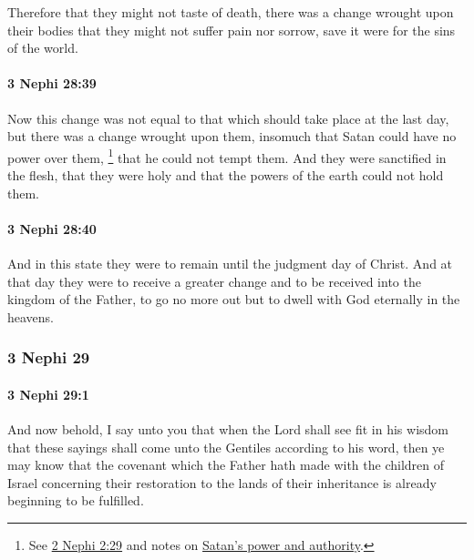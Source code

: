 			Therefore that they might not taste of death,
			there was a change wrought upon their bodies
			that they might not suffer pain nor sorrow,
			save it were for the sins of the world.

		\paragraph{3 Nephi 28:39} %
			\label{3NEPHI-28-39}

			Now this change was not equal
			to that which should take place at the last day,
			but there was a change wrought upon them,
			insomuch that Satan could have no power over them,%
				\footnote{%
					See \hyperref[2NEPHI-2-29]{2 Nephi 2:29} and notes on \hyperref[SATAN-power]{Satan's power and authority}.
					}
			that he could not tempt them.
			And they were sanctified in the flesh, that they were holy
			and that the powers of the earth could not hold them.

		\paragraph{3 Nephi 28:40} %
			\label{3NEPHI-28-40}

			And in this state they were to remain until the judgment day of Christ.
			And at that day they were to receive a greater change
			and to be received into the kingdom of the Father,
			to go no more out but to dwell with God eternally in the heavens.

	\subsubsection{3 Nephi 29} %
		\label{3NEPHI-29}
		
		\paragraph{3 Nephi 29:1} %
			\label{3NEPHI-29-1}

			And now behold, I say unto you
			that when the Lord shall see fit in his wisdom
			that these sayings shall come unto the Gentiles according to his word,
			then ye may know that the covenant
			which the Father hath made with the children of Israel
			concerning their restoration to the lands of their inheritance
			is already beginning to be fulfilled.

